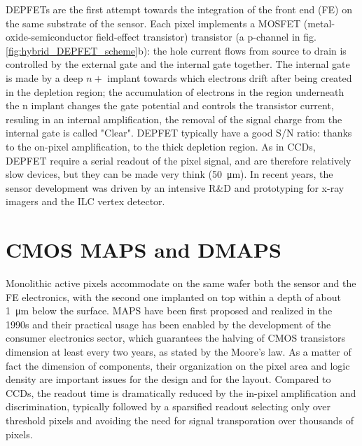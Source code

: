    DEPFETs are the first attempt towards the integration of the front end (FE) on the same substrate of the sensor.
   Each pixel implements a MOSFET (metal-oxide-semiconductor field-effect transistor) transistor (a p-channel in fig. \ref{fig:hybrid_DEPFET_scheme}b): the hole current flows from source to drain is controlled by the external gate and the internal gate together. The internal gate is made by a deep $n+$ implant towards which electrons drift after being created in the depletion region; the accumulation of electrons in the region underneath the n implant changes the gate potential and controls the transistor current, resuling in an internal amplification, the removal of the signal charge from the internal gate is called "Clear". 
   DEPFET typically have a good S/N ratio: thanks to the on-pixel amplification, to the thick depletion region. 
   As in CCDs, DEPFET require a serial readout of the pixel signal, and are therefore relatively slow devices, but they can be made very think (\SI{50}{\um}).
   In recent years, the sensor development was driven by an intensive R$\&$D and prototyping for x-ray imagers and the ILC vertex detector. 
   

\section{CMOS MAPS and DMAPS}\label{sec:MAPS_DMAPS}
   Monolithic active pixels accommodate on the same wafer both the sensor and the FE electronics, with the second one implanted on top within a depth of about \SI{1}{\um} below the surface. 
   MAPS have been first proposed and realized in the 1990s and their practical usage has been enabled by the development of the consumer electronics sector, which guarantees the halving of CMOS transistors dimension at least every two years, as stated by the Moore's law.
   As a matter of fact the dimension of components, their organization on the pixel area and logic density are important issues for the design and for the layout.
   Compared to CCDs, the readout time is dramatically reduced by the in-pixel amplification and discrimination, typically followed by a sparsified readout selecting only over threshold pixels and avoiding the need for signal transporation over thousands of pixels.

